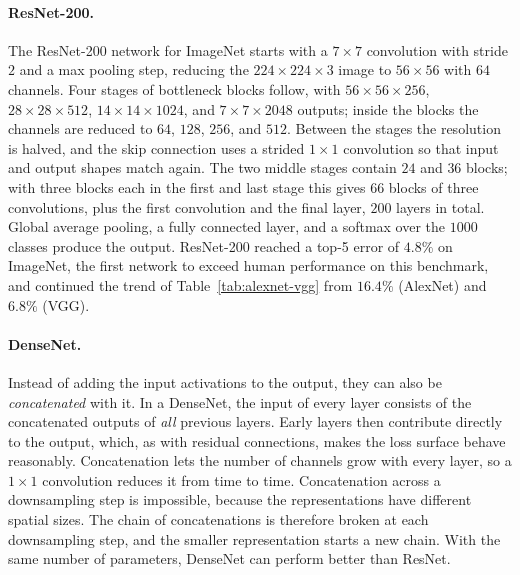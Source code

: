 \paragraph{ResNet-200.}
The ResNet-200 network for ImageNet starts with a $7\times7$ convolution with
stride $2$ and a max pooling step, reducing the $224\times224\times3$ image to
$56\times56$ with $64$ channels. Four stages of bottleneck blocks follow, with
$56\times56\times256$, $28\times28\times512$, $14\times14\times1024$, and
$7\times7\times2048$ outputs; inside the blocks the channels are reduced to $64$,
$128$, $256$, and $512$. Between the stages the resolution is halved, and the
skip connection uses a strided $1\times1$ convolution so that input and output
shapes match again. The two middle stages contain $24$ and $36$ blocks; with
three blocks each in the first and last stage this gives $66$ blocks of three
convolutions, plus the first convolution and the final layer, $200$ layers in
total. Global average pooling, a fully connected layer, and a softmax over the
$1000$ classes produce the output. ResNet-200 reached a top-5 error of $4.8\%$ on
ImageNet, the first network to exceed human performance on this benchmark, and
continued the trend of Table~\ref{tab:alexnet-vgg} from $16.4\%$ (AlexNet)
and $6.8\%$ (VGG).

\paragraph{DenseNet.}
Instead of adding the input activations to the output, they can also be
\emph{concatenated} with it. In a DenseNet, the input of every layer consists of
the concatenated outputs of \emph{all} previous layers. Early layers then
contribute directly to the output, which, as with residual connections, makes
the loss surface behave reasonably. Concatenation lets the number of channels
grow with every layer, so a $1\times1$ convolution reduces it from time to
time. Concatenation across a downsampling step is impossible, because the
representations have different spatial sizes. The chain of concatenations is
therefore broken at each downsampling step, and the smaller representation
starts a new chain. With the same number of parameters, DenseNet can perform
better than ResNet.

